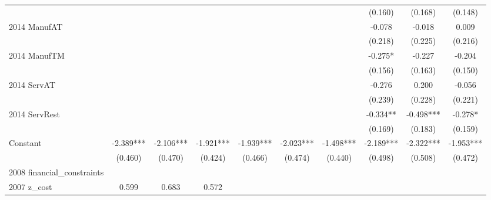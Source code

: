\begin{table}[htbp]
\begin{tabular}{l*{9}{c}}
                    &               &               &               &               &               &               &     (0.160)   &     (0.168)   &     (0.148)   \\
2014 ManufAT        &               &               &               &               &               &               &      -0.078   &      -0.018   &       0.009   \\
                    &               &               &               &               &               &               &     (0.218)   &     (0.225)   &     (0.216)   \\
2014 ManufTM        &               &               &               &               &               &               &      -0.275*  &      -0.227   &      -0.204   \\
                    &               &               &               &               &               &               &     (0.156)   &     (0.163)   &     (0.150)   \\
2014 ServAT         &               &               &               &               &               &               &      -0.276   &       0.200   &      -0.056   \\
                    &               &               &               &               &               &               &     (0.239)   &     (0.228)   &     (0.221)   \\
2014 ServRest       &               &               &               &               &               &               &      -0.334** &      -0.498***&      -0.278*  \\
                    &               &               &               &               &               &               &     (0.169)   &     (0.183)   &     (0.159)   \\
Constant            &      -2.389***&      -2.106***&      -1.921***&      -1.939***&      -2.023***&      -1.498***&      -2.189***&      -2.322***&      -1.953***\\
                    &     (0.460)   &     (0.470)   &     (0.424)   &     (0.466)   &     (0.474)   &     (0.440)   &     (0.498)   &     (0.508)   &     (0.472)   \\
\hline
2008 financial\_constraints&               &               &               &               &               &               &               &               &               \\
2007 z\_cost         &       0.599   &       0.683   &       0.572   &               &               &               &               &               &               \\

\end{tabular}
\end{table}
